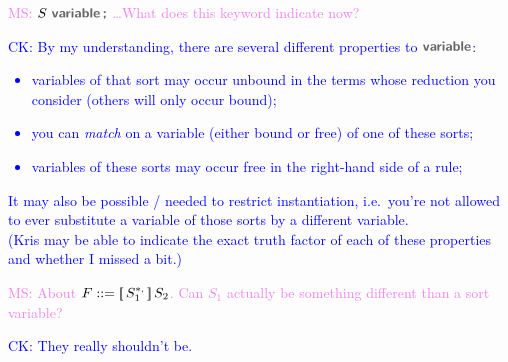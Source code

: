 \documentclass[letterpaper,11pt]{article}
\newcommand{\CK}[1]{\textcolor{blue}{CK: #1}}
\newcommand{\MS}[1]{\textcolor{violet}{MS: #1}}
\begin{document}
\MS{$S~\kw{variable}\,\kw;$ \ldots What does this keyword indicate now?}

\CK{By my understanding, there are several different properties to $\kw{variable}$:
  \begin{itemize}
  \item variables of that sort may occur unbound in the terms whose reduction
    you consider (others will only occur bound);
  \item you can \emph{match} on a variable (either bound or free) of one of
    these sorts;
  \item variables of these sorts may occur free in the right-hand side of a
    rule;
  \end{itemize}
  It may also be possible / needed to restrict instantiation, i.e.~you're not
  allowed to ever substitute a variable of those sorts by a different variable. \\
  (Kris may be able to indicate the exact truth factor of each of these
  properties and whether I missed a bit.)
}

\MS{About $F ::= \kw[\,S_1^{*\kw,}\,\kw]\,S_2$. Can $S_1$ actually be something different than a sort variable?}

\CK{They really shouldn't be.}
\end{document}
